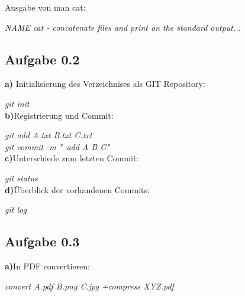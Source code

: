 \documentclass[a4paper,graphics,11pt]{article}
\newcommand{\aufgabe}[1]{\subsection*{Aufgabe #1}}
\begin{document}
\newpage

Ausgabe von man cat:

\textit{NAME cat - concatenate files and print on the standard output...}\\

\aufgabe{0.2}

\textbf{a)} Initialisierung des Verzeichnises als GIT Repository:

\textit{git init}\\

\textbf{b)}Registrierung und Commit:

\textit{git add A.txt B.txt C.txt \\
	git commit -m "\ add A B C"}\\

\textbf{c)}Unterschiede zum letzten Commit:

\textit{git status}\\

\textbf{d)}Überblick der vorhandenen Commits:

\textit{git log}\\

\aufgabe{0.3}

\textbf{a)}In PDF convertieren:

\textit{convert A.pdf B.png C.jpg +compress XYZ.pdf}\\
\end{document}
